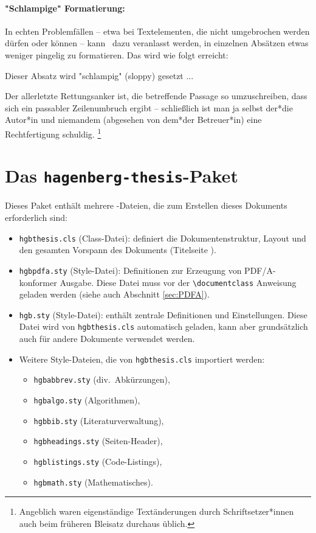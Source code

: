 \paragraph{"Schlampige" Formatierung:} In echten Problemfällen -- etwa bei
Textelementen, die nicht umgebrochen werden dürfen oder können -- kann
\latex\ dazu veranlasst werden, in einzelnen Absätzen etwas weniger pingelig
zu formatieren. Das wird wie folgt erreicht:
%
\begin{LaTeXCode}[numbers=none]
\begin{sloppypar}
	Dieser Absatz wird "schlampig" (sloppy) gesetzt ...
\end{sloppypar}
\end{LaTeXCode}
%
Der allerletzte Rettungsanker ist, die betreffende Passage so umzuschreiben,
dass sich ein passabler Zeilenumbruch ergibt -- schließlich ist man ja selbst
der*die Autor*in und niemandem (abgesehen von dem*der Betreuer*in) eine
Rechtfertigung schuldig.%
\footnote{Angeblich waren eigenständige Textänderungen durch Schriftsetzer*innen
auch beim früheren Bleisatz durchaus üblich.}


\section{Das \texttt{hagenberg-thesis}-Paket}

Dieses Paket enthält mehrere \latex-Dateien, die zum Erstellen dieses
Dokuments erforderlich sind:
%
\begin{itemize}
  \item \nolinkurl{hgbthesis.cls} (Class-Datei): definiert die
    Dokumentenstruktur, Layout und den gesamten Vorspann des Dokuments
    (Titelseite \etc).
  \item \nolinkurl{hgbpdfa.sty} (Style-Datei): Definitionen zur
    Erzeugung von PDF/A-konformer Ausgabe. Diese Datei muss vor
    der \verb!\documentclass! Anweisung geladen werden (siehe auch Abschnitt 
    \ref{sec:PDFA}).
  \item \nolinkurl{hgb.sty} (Style-Datei): enthält zentrale Definitionen
    und Einstellungen. Diese Datei wird von \nolinkurl{hgbthesis.cls}
    automatisch geladen, kann aber grundsätzlich auch für andere Dokumente
    verwendet werden.
  \item Weitere Style-Dateien, die von \nolinkurl{hgbthesis.cls} importiert
    werden:
    \begin{itemize}
        \item[] \nolinkurl{hgbabbrev.sty} (div.\ Abkürzungen),
        \item[] \nolinkurl{hgbalgo.sty} (Algorithmen),
        \item[] \nolinkurl{hgbbib.sty} (Literaturverwaltung),
        \item[] \nolinkurl{hgbheadings.sty} (Seiten-Header),
        \item[] \nolinkurl{hgblistings.sty} (Code-Listings),
        \item[] \nolinkurl{hgbmath.sty} (Mathematisches).
    \end{itemize}
\end{itemize}


